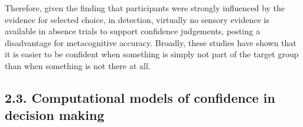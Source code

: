 \documentclass[
]{article}
\begin{document}
Therefore, given the finding that participants were strongly influenced
by the evidence for selected choice, in detection, virtually no sensory
evidence is available in absence trials to support confidence
judgements, posting a disadvantage for metacognitive accuracy. Broadly,
these studies have shown that it is easier to be confident when
something is simply not part of the target group than when something is
not there at all.

\hypertarget{computational-models-of-confidence-in-decision-making}{%
\subsection{2.3. Computational models of confidence in decision
making}\label{computational-models-of-confidence-in-decision-making}}
\end{document}
